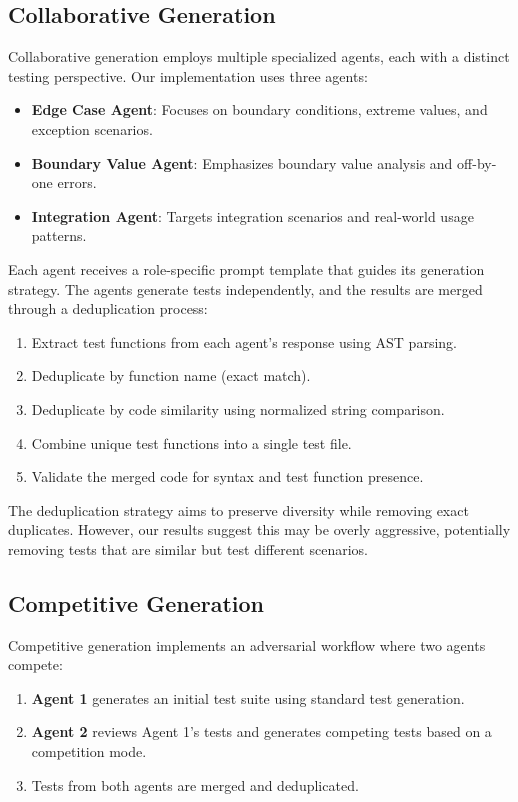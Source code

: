 \documentclass[11pt]{article}
\begin{document}
\subsection{Collaborative Generation}

Collaborative generation employs multiple specialized agents, each with a distinct testing perspective. Our implementation uses three agents:

\begin{itemize}
\item \textbf{Edge Case Agent}: Focuses on boundary conditions, extreme values, and exception scenarios.
\item \textbf{Boundary Value Agent}: Emphasizes boundary value analysis and off-by-one errors.
\item \textbf{Integration Agent}: Targets integration scenarios and real-world usage patterns.
\end{itemize}

Each agent receives a role-specific prompt template that guides its generation strategy. The agents generate tests independently, and the results are merged through a deduplication process:

\begin{enumerate}
\item Extract test functions from each agent's response using AST parsing.
\item Deduplicate by function name (exact match).
\item Deduplicate by code similarity using normalized string comparison.
\item Combine unique test functions into a single test file.
\item Validate the merged code for syntax and test function presence.
\end{enumerate}

The deduplication strategy aims to preserve diversity while removing exact duplicates. However, our results suggest this may be overly aggressive, potentially removing tests that are similar but test different scenarios.

\subsection{Competitive Generation}

Competitive generation implements an adversarial workflow where two agents compete:

\begin{enumerate}
\item \textbf{Agent 1} generates an initial test suite using standard test generation.
\item \textbf{Agent 2} reviews Agent 1's tests and generates competing tests based on a competition mode.
\item Tests from both agents are merged and deduplicated.
\end{enumerate}
\end{document}
